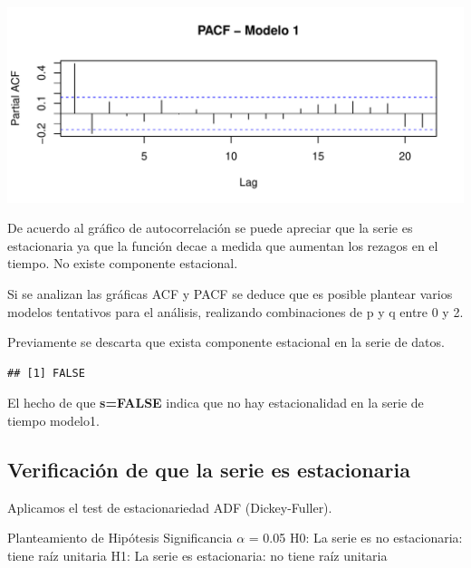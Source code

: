 \documentclass[
  11pt,
]{article}
\newenvironment{Shaded}{\begin{snugshade}}{\end{snugshade}}
\newcommand{\KeywordTok}[1]{\textcolor[rgb]{0.13,0.29,0.53}{\textbf{#1}}}
\newcommand{\NormalTok}[1]{#1}
\newcommand{\OperatorTok}[1]{\textcolor[rgb]{0.81,0.36,0.00}{\textbf{#1}}}
\newcommand{\StringTok}[1]{\textcolor[rgb]{0.31,0.60,0.02}{#1}}
\begin{document}
\begin{center}\includegraphics[width=0.9\linewidth]{RmdFigs/pacfM1-1} \end{center}

De acuerdo al gráfico de autocorrelación se puede apreciar que la serie
es estacionaria ya que la función decae a medida que aumentan los
rezagos en el tiempo. No existe componente estacional.

Si se analizan las gráficas ACF y PACF se deduce que es posible plantear
varios modelos tentativos para el análisis, realizando combinaciones de
p y q entre 0 y 2.

Previamente se descarta que exista componente estacional en la serie de
datos.

\begin{Shaded}
\end{Shaded}

\begin{verbatim}
## [1] FALSE
\end{verbatim}

El hecho de que \textbf{s=FALSE} indica que no hay estacionalidad en la
serie de tiempo modelo1.

\hypertarget{verificaciuxf3n-de-que-la-serie-es-estacionaria}{%
\subsection{Verificación de que la serie es
estacionaria}\label{verificaciuxf3n-de-que-la-serie-es-estacionaria}}

Aplicamos el test de estacionariedad ADF (Dickey-Fuller).

Planteamiento de Hipótesis Significancia \(\alpha\) = 0.05 H0: La serie
es no estacionaria: tiene raíz unitaria H1: La serie es estacionaria: no
tiene raíz unitaria
\end{document}
